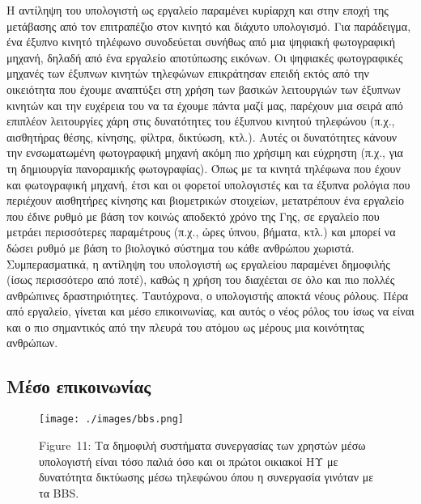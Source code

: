 \documentclass[
]{article}
\begin{document}
Η αντίληψη του υπολογιστή ως εργαλείο παραμένει κυρίαρχη και στην εποχή
της μετάβασης από τον επιτραπέζιο στον κινητό και διάχυτο υπολογισμό.
Για παράδειγμα, ένα έξυπνο κινητό τηλέφωνο συνοδεύεται συνήθως από μια
ψηφιακή φωτογραφική μηχανή, δηλαδή από ένα εργαλείο αποτύπωσης εικόνων.
Οι ψηφιακές φωτογραφικές μηχανές των έξυπνων κινητών τηλεφώνων
επικράτησαν επειδή εκτός από την οικειότητα που έχουμε αναπτύξει στη
χρήση των βασικών λειτουργιών των έξυπνων κινητών και την ευχέρεια του
να τα έχουμε πάντα μαζί μας, παρέχουν μια σειρά από επιπλέον λειτουργίες
χάρη στις δυνατότητες του έξυπνου κινητού τηλεφώνου (π.χ., αισθητήρας
θέσης, κίνησης, φίλτρα, δικτύωση, κτλ.). Αυτές οι δυνατότητες κάνουν την
ενσωματωμένη φωτογραφική μηχανή ακόμη πιο χρήσιμη και εύχρηστη (π.χ.,
για τη δημιουργία πανοραμικής φωτογραφίας). Όπως με τα κινητά τηλέφωνα
που έχουν και φωτογραφική μηχανή, έτσι και οι φορετοί υπολογιστές και τα
έξυπνα ρολόγια που περιέχουν αισθητήρες κίνησης και βιομετρικών
στοιχείων, μετατρέπουν ένα εργαλείο που έδινε ρυθμό με βάση τον κοινώς
αποδεκτό χρόνο της Γης, σε εργαλείο που μετράει περισσότερες παραμέτρους
(π.χ., ώρες ύπνου, βήματα, κτλ.) και μπορεί να δώσει ρυθμό με βάση το
βιολογικό σύστημα του κάθε ανθρώπου χωριστά. Συμπερασματικά, η αντίληψη
του υπολογιστή ως εργαλείου παραμένει δημοφιλής (ίσως περισσότερο από
ποτέ), καθώς η χρήση του διαχέεται σε όλο και πιο πολλές ανθρώπινες
δραστηριότητες. Ταυτόχρονα, ο υπολογιστής αποκτά νέους ρόλους. Πέρα από
εργαλείο, γίνεται και μέσο επικοινωνίας, και αυτός ο νέος ρόλος του ίσως
να είναι και ο πιο σημαντικός από την πλευρά του ατόμου ως μέρους μια
κοινότητας ανθρώπων.

\hypertarget{ux3bcux3adux3c3ux3bf-ux3b5ux3c0ux3b9ux3baux3bfux3b9ux3bdux3c9ux3bdux3afux3b1ux3c2}{%
\subsection{Μέσο
επικοινωνίας}\label{ux3bcux3adux3c3ux3bf-ux3b5ux3c0ux3b9ux3baux3bfux3b9ux3bdux3c9ux3bdux3afux3b1ux3c2}}

\leavevmode{}%
\begin{figure}
\hypertarget{fig:bbs}{%
\centering
\texttt{[image: ./images/bbs.png]}
\caption{Figure~11: Τα δημοφιλή συστήματα συνεργασίας των χρηστών μέσω
υπολογιστή είναι τόσο παλιά όσο και οι πρώτοι οικιακοί ΗΥ με δυνατότητα
δικτύωσης μέσω τηλεφώνου όπου η συνεργασία γινόταν με τα
BBS.}\label{fig:bbs}
}
\end{figure}
\end{document}
